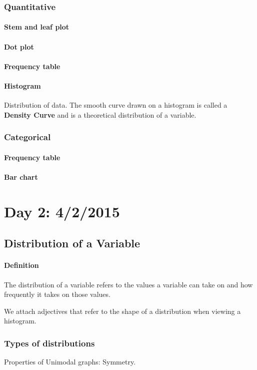 \documentclass{article}
\newcommand{\p}[1]{\paragraph{#1}} %
\begin{document}
		\subsubsection{Quantitative}
			\p{Stem and leaf plot}
			\p{Dot plot}
			\p{Frequency table}
			\p{Histogram}
			Distribution of data. The smooth curve drawn on a histogram is called a 
			\textbf{Density Curve} and is a theoretical distribution of a variable.
			
		\subsubsection{Categorical}
			\p{Frequency table}
			\p{Bar chart}

\section{Day 2:  4/2/2015}

	\subsection{Distribution of a Variable}
	\p{Definition}
	The distribution of a variable refers to the values a variable can take on and how frequently it
	takes on those values.
	
	We attach adjectives that refer to the shape of a distribution when viewing a histogram.
	
		\subsubsection{Types of distributions}
		
			Properties of Unimodal graphs: Symmetry.
\end{document}

